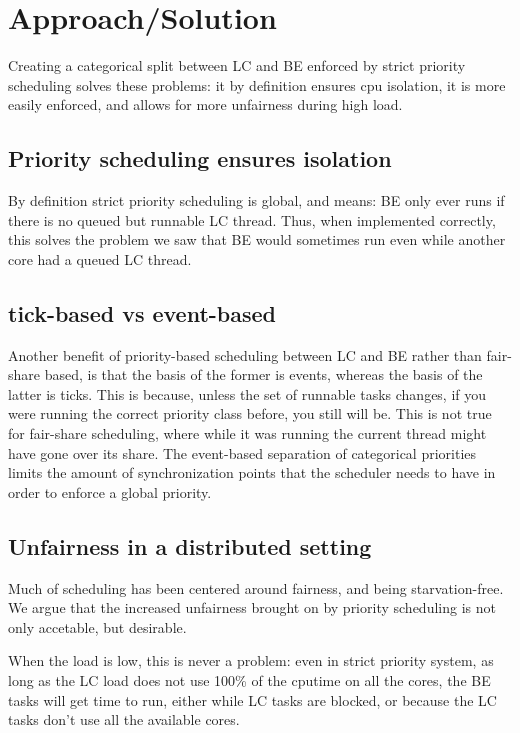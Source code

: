 \section{Approach/Solution}\label{s:approach}

Creating a categorical split between LC and BE enforced by strict priority
scheduling solves these problems: it by definition ensures cpu isolation, it is
more easily enforced, and allows for more unfairness during high load.

\subsection{Priority scheduling ensures isolation}

By definition strict priority scheduling is global, and means: BE only ever runs
if there is no queued but runnable LC thread. Thus, when implemented correctly,
this solves the problem we saw that BE would sometimes run even while another
core had a queued LC thread.

\subsection{tick-based vs event-based}

Another benefit of priority-based scheduling between LC and BE rather than
fair-share based, is that the basis of the former is events, whereas the basis
of the latter is ticks. This is because, unless the set of runnable tasks
changes, if you were running the correct priority class before, you still will
be. This is not true for fair-share scheduling, where while it was running the
current thread might have gone over its share. The event-based separation of
categorical priorities limits the amount of synchronization points that the
scheduler needs to have in order to enforce a global priority.

\subsection{Unfairness in a distributed setting}

Much of scheduling has been centered around fairness, and being starvation-free.
We argue that the increased unfairness brought on by priority scheduling is not
only accetable, but desirable.

When the load is low, this is never a problem: even in strict priority system,
as long as the LC load does not use 100\% of the cputime on all the cores, the
BE tasks will get time to run, either while LC tasks are blocked, or because the
LC tasks don't use all the available cores.

